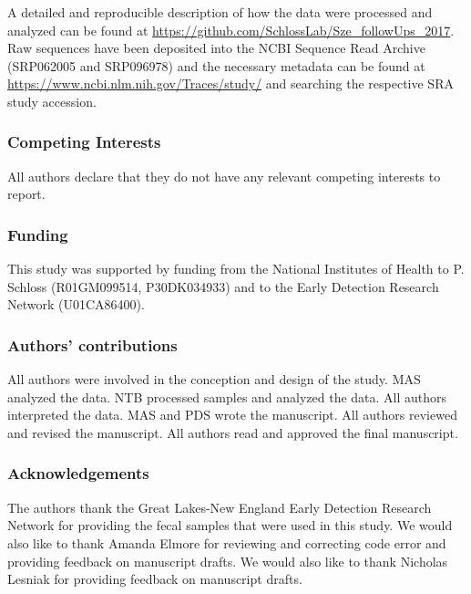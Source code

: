 \documentclass[12pt,]{article}
\begin{document}
A detailed and reproducible description of how the data were processed
and analyzed can be found at
\url{https://github.com/SchlossLab/Sze_followUps_2017}. Raw sequences
have been deposited into the NCBI Sequence Read Archive (SRP062005 and
SRP096978) and the necessary metadata can be found at
\url{https://www.ncbi.nlm.nih.gov/Traces/study/} and searching the
respective SRA study accession.

\subsubsection{Competing Interests}\label{competing-interests}

All authors declare that they do not have any relevant competing
interests to report.

\subsubsection{Funding}\label{funding}

This study was supported by funding from the National Institutes of
Health to P. Schloss (R01GM099514, P30DK034933) and to the Early
Detection Research Network (U01CA86400).

\subsubsection{Authors' contributions}\label{authors-contributions}

All authors were involved in the conception and design of the study. MAS
analyzed the data. NTB processed samples and analyzed the data. All
authors interpreted the data. MAS and PDS wrote the manuscript. All
authors reviewed and revised the manuscript. All authors read and
approved the final manuscript.

\subsubsection{Acknowledgements}\label{acknowledgements}

The authors thank the Great Lakes-New England Early Detection Research
Network for providing the fecal samples that were used in this study. We
would also like to thank Amanda Elmore for reviewing and correcting code
error and providing feedback on manuscript drafts. We would also like to
thank Nicholas Lesniak for providing feedback on manuscript drafts.

\newpage
\end{document}
